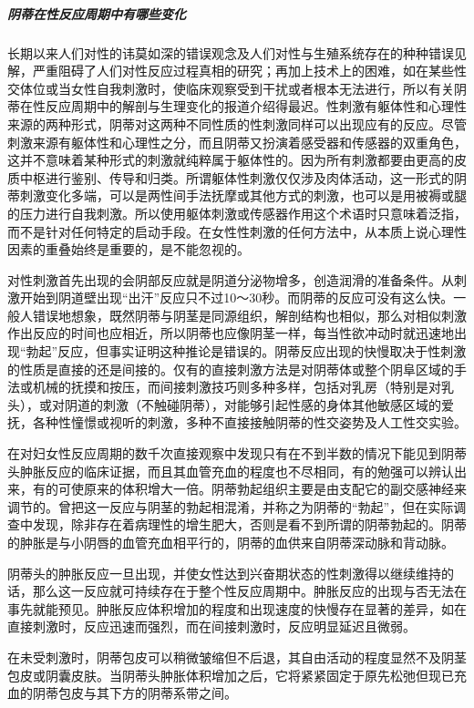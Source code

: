 \begin{enumerate}
\subparagraph{阴蒂在性反应周期中有哪些变化}
长期以来人们对性的讳莫如深的错误观念及人们对性与生殖系统存在的种种错误见解，严重阻碍了人们对性反应过程真相的研究；再加上技术上的困难，如在某些性交体位或当女性自我刺激时，使临床观察受到干扰或者根本无法进行，所以有关阴蒂在性反应周期中的解剖与生理变化的报道介绍得最迟。性刺激有躯体性和心理性来源的两种形式，阴蒂对这两种不同性质的性刺激同样可以出现应有的反应。尽管刺激来源有躯体性和心理性之分，而且阴蒂又扮演着感受器和传感器的双重角色，这并不意味着某种形式的刺激就纯粹属于躯体性的。因为所有刺激都要由更高的皮质中枢进行鉴别、传导和归类。所谓躯体性刺激仅仅涉及肉体活动，这一形式的阴蒂刺激变化多端，可以是两性间手法抚摩或其他方式的刺激，也可以是用被褥或腿的压力进行自我刺激。所以使用躯体刺激或传感器作用这个术语时只意味着泛指，而不是针对任何特定的启动手段。在女性性刺激的任何方法中，从本质上说心理性因素的重叠始终是重要的，是不能忽视的。

对性刺激首先出现的会阴部反应就是阴道分泌物增多，创造润滑的准备条件。从刺激开始到阴道壁出现“出汗”反应只不过10～30秒。而阴蒂的反应可没有这么快。一般人错误地想象，既然阴蒂与阴茎是同源组织，解剖结构也相似，那么对相似刺激作出反应的时间也应相近，所以阴蒂也应像阴茎一样，每当性欲冲动时就迅速地出现“勃起”反应，但事实证明这种推论是错误的。阴蒂反应出现的快慢取决于性刺激的性质是直接的还是间接的。仅有的直接刺激方法是对阴蒂体或整个阴阜区域的手法或机械的抚摸和按压，而间接刺激技巧则多种多样，包括对乳房（特别是对乳头），或对阴道的刺激（不触碰阴蒂），对能够引起性感的身体其他敏感区域的爱抚，各种性憧憬或视听的刺激，多种不直接接触阴蒂的性交姿势及人工性交实验。

在对妇女性反应周期的数千次直接观察中发现只有在不到半数的情况下能见到阴蒂头肿胀反应的临床证据，而且其血管充血的程度也不尽相同，有的勉强可以辨认出来，有的可使原来的体积增大一倍。阴蒂勃起组织主要是由支配它的副交感神经来调节的。曾把这一反应与阴茎的勃起相混淆，并称之为阴蒂的“勃起”，但在实际调查中发现，除非存在着病理性的增生肥大，否则是看不到所谓的阴蒂勃起的。阴蒂的肿胀是与小阴唇的血管充血相平行的，阴蒂的血供来自阴蒂深动脉和背动脉。

阴蒂头的肿胀反应一旦出现，并使女性达到兴奋期状态的性刺激得以继续维持的话，那么这一反应就可持续存在于整个性反应周期中。肿胀反应的出现与否无法在事先就能预见。肿胀反应体积增加的程度和出现速度的快慢存在显著的差异，如在直接刺激时，反应迅速而强烈，而在间接刺激时，反应明显延迟且微弱。

在未受刺激时，阴蒂包皮可以稍微皱缩但不后退，其自由活动的程度显然不及阴茎包皮或阴囊皮肤。当阴蒂头肿胀体积增加之后，它将紧紧固定于原先松弛但现已充血的阴蒂包皮与其下方的阴蒂系带之间。


\end{enumerate}
